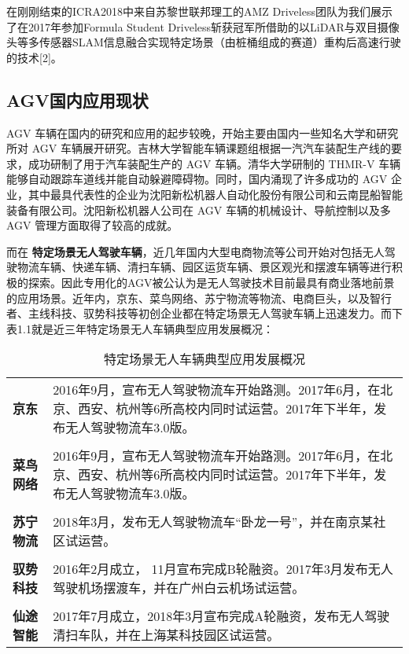 在刚刚结束的ICRA2018中来自苏黎世联邦理工的AMZ Driveless团队为我们展示了在2017年参加Formula Student Driveless斩获冠军所借助的以LiDAR与双目摄像头等多传感器SLAM信息融合实现特定场景（由桩桶组成的赛道）重构后高速行驶的技术[2]。

\subsection{AGV国内应用现状}

AGV 车辆在国内的研究和应用的起步较晚，开始主要由国内一些知名大学和研究所对 AGV 车辆展开研究。吉林大学智能车辆课题组根据一汽汽车装配生产线的要求，成功研制了用于汽车装配生产的 AGV 车辆。清华大学研制的 THMR-V 车辆能够自动跟踪车道线并能自动躲避障碍物。同时，国内涌现了许多成功的 AGV 企业，其中最具代表性的企业为沈阳新松机器人自动化股份有限公司和云南昆船智能装备有限公司。沈阳新松机器人公司在 AGV 车辆的机械设计、导航控制以及多 AGV 管理方面取得了较高的成就。

而在 \textbf{特定场景无人驾驶车辆}，近几年国内大型电商物流等公司开始对包括无人驾驶物流车辆、快递车辆、清扫车辆、园区运货车辆、景区观光和摆渡车辆等进行积极的探索。因此专用化的AGV被公认为是无人驾驶技术目前最具有商业落地前景的应用场景。近年内，京东、菜鸟网络、苏宁物流等物流、电商巨头，以及智行者、主线科技、驭势科技等初创企业都在特定场景无人驾驶车辆上迅速发力。而下表1.1就是近三年特定场景无人车辆典型应用发展概况：

\begin{table}[htbp]
	\centering%
	\caption[centering]{特定场景无人车辆典型应用发展概况}%
	\label{共享单车日均使用总量与对应时间段的共享单车数量}%
	\begin{tabular}{C{2cm}p{10cm}}	
		\toprule
		 & \\ 
		\midrule
		\textbf{京东} & 2016年9月，宣布无人驾驶物流车开始路测。2017年6月，在北京、西安、杭州等6所高校内同时试运营。2017年下半年，发布无人驾驶物流车3.0版。 \\
		\\
		\textbf{菜鸟网络} & 2016年9月，宣布无人驾驶物流车开始路测。2017年6月，在北京、西安、杭州等6所高校内同时试运营。2017年下半年，发布无人驾驶物流车3.0版。 \\
		\\
		\textbf{苏宁物流} & 2018年3月，发布无人驾驶物流车“卧龙一号”，并在南京某社区试运营。 \\
		\\
		\textbf{驭势科技} & 2016年2月成立， 11月宣布完成B轮融资。2017年3月发布无人驾驶机场摆渡车，并在广州白云机场试运营。 \\
		\\
		\textbf{仙途智能} & 2017年7月成立，2018年3月宣布完成A轮融资，发布无人驾驶清扫车队，并在上海某科技园区试运营。\\
		\bottomrule
	\end{tabular}
\end{table}

